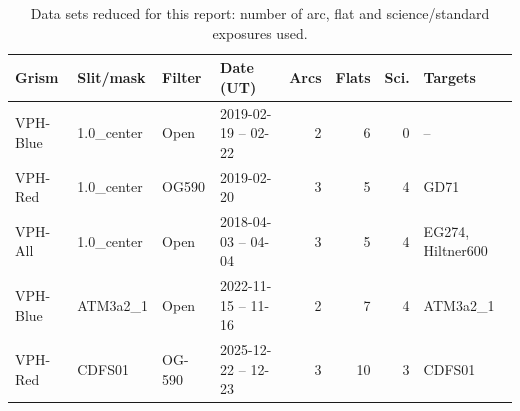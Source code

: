 \begin{table}[t]
  \centering\small
  \caption{Data sets reduced for this report: number of arc, flat and
    science/standard exposures used.}
  \label{tab:datasets}
  \begin{tabular}{llllrrrl}
    \toprule
    Grism & Slit/mask & Filter & Date (UT) & Arcs & Flats & Sci. & Targets \\
    \midrule
    VPH-Blue & 1.0\_center & Open & 2019-02-19 -- 02-22 & 2 & 6 & 0 & -- \\
    VPH-Red & 1.0\_center & OG590 & 2019-02-20 & 3 & 5 & 4 & GD71 \\
    VPH-All & 1.0\_center & Open & 2018-04-03 -- 04-04 & 3 & 5 & 4 & EG274, Hiltner600 \\
    VPH-Blue & ATM3a2\_1 & Open & 2022-11-15 -- 11-16 & 2 & 7 & 4 & ATM3a2\_1 \\
    VPH-Red & CDFS01 & OG-590 & 2025-12-22 -- 12-23 & 3 & 10 & 3 & CDFS01 \\
    \bottomrule
  \end{tabular}
\end{table}
